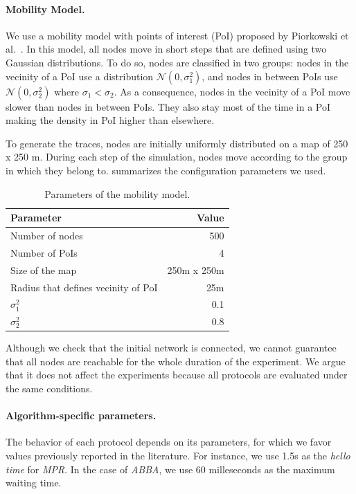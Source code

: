 \paragraph{Mobility Model.}
We use a mobility model with points of interest (PoI) proposed by Piorkowski et al.~\cite{mobility_density_model}.
%
In this model, all nodes move in short steps that are defined using two Gaussian distributions.
%
To do so, nodes are classified in two groups: nodes in the vecinity of a PoI use a distribution $\mathcal{N}(0, \sigma_1^{2})$, and nodes in between PoIs use $\mathcal{N}(0, \sigma_2^{2})$ where $\sigma_1 <  \sigma_2$.
%
As a consequence, nodes in the vecinity of a PoI move slower than nodes in between PoIs.
%
They also stay most of the time in a PoI making the density in PoI  higher than elsewhere.

To generate the traces, nodes are initially uniformly distributed on a map of 250 x 250 m.
%
During each step of the simulation, nodes move according to the group in which they belong to.   
%
 summarizes the configuration parameters we used. 

\begin{table}[ht]
	\footnotesize
	\centering
	
	\begin{tabular}{lr}
		\textbf{Parameter} & \textbf{Value} \\
		\midrule
		Number of nodes  & 500 \\
		Number of PoIs & 4 \\
		Size of the map & 250m x 250m \\
		Radius that defines vecinity of PoI  & 25m \\
		$\sigma_{1}^{2}$ & 0.1 \\
		$\sigma_{2}^{2}$ & 0.8 \\
	\end{tabular}
	
	\caption{Parameters of the mobility model.}
\end{table}


%
Although we check that the initial network is connected, we cannot guarantee that all nodes are reachable for the whole duration of the experiment.
%
We argue that it does not affect the experiments because all protocols are evaluated under the same conditions.


\paragraph{Algorithm-specific parameters.}
The behavior of each protocol depends on its parameters, for which we favor values previously reported in the literature.
%
For instance, we use 1.5s as the \emph{hello time} for \emph{MPR}.
%
In the case of \emph{ABBA}, we use 60 milleseconds as the maximum waiting time.
%

